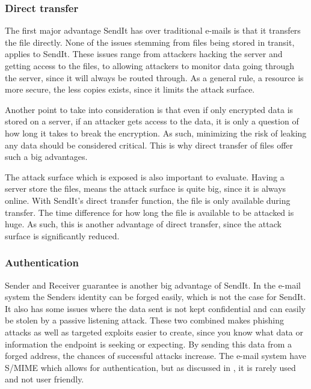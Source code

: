   \subsubsection*{Direct transfer}
  The first major advantage SendIt has over traditional e-mails is that it transfers the file directly. None of the issues stemming from files being stored in transit, applies to SendIt. These issues range from attackers hacking the server and getting access to the files, to allowing attackers to monitor data going through the server, since it will always be routed through. As a general rule, a resource is more secure, the less copies exists, since it limits the attack surface.

  Another point to take into consideration is that even if only encrypted data is stored on a server, if an attacker gets access to the data, it is only a question of how long it takes to break the encryption. As such, minimizing the risk of leaking any data should be considered critical. This is why direct transfer of files offer such a big advantages.

  The attack surface which is exposed is also important to evaluate. Having a server store the files, means the attack surface is quite big, since it is always online. With SendIt's direct transfer function, the file is only available during transfer. The time difference for how long the file is available to be attacked is huge. As such, this is another advantage of direct transfer, since the attack surface is significantly reduced.
%
  \subsubsection*{Authentication}
  Sender and Receiver guarantee is another big advantage of SendIt. In the e-mail system the Senders identity can be forged easily, which is not the case for SendIt. It also has some issues where the data sent is not kept confidential and can easily be stolen by a passive listening attack. These two combined makes phishing attacks as well as targeted exploits easier to create, since you know what data or information the endpoint is seeking or expecting. By sending this data from a forged address, the chances of successful attacks increase. The e-mail system have S/MIME which allows for authentication, but as discussed in , it is rarely used and not user friendly.
